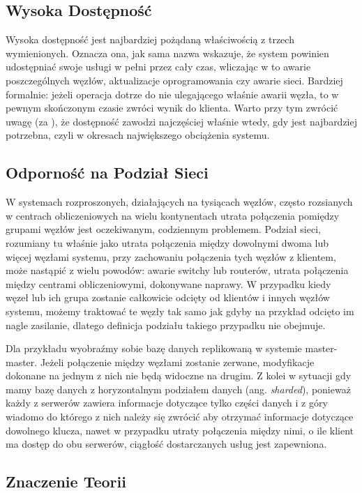 \subsection*{Wysoka Dostępność}

Wysoka dostępność jest najbardziej pożądaną właściwością z trzech wymienionych.
Oznacza ona, jak sama nazwa wskazuje, że system powinien udostępniać swoje usługi w pełni przez cały czas, wliczając w to awarie poszczególnych węzłów, aktualizacje oprogramowania czy awarie sieci. 
Bardziej formalnie: jeżeli operacja dotrze do nie ulegającego właśnie awarii węzła, to w pewnym skończonym czasie zwróci wynik do klienta.
Warto przy tym zwrócić uwagę (za \cite{brewers-conjecture}), że dostępność zawodzi najczęściej właśnie wtedy, gdy jest najbardziej potrzebna, czyli w okresach największego obciążenia systemu.

\subsection*{Odporność na Podział Sieci}

W systemach rozproszonych, działających na tysiącach węzłów, często rozsianych w centrach obliczeniowych na wielu kontynentach utrata połączenia pomiędzy grupami węzłów jest oczekiwanym, codziennym problemem.
Podział sieci, rozumiany tu właśnie jako utrata połączenia między dowolnymi dwoma lub więcej węzłami systemu, przy zachowaniu połączenia tych węzłów z klientem, może nastąpić z wielu powodów: awarie switchy lub routerów, utrata połączenia między centrami obliczeniowymi, dokonywane naprawy.
W przypadku kiedy węzeł lub ich grupa zostanie całkowicie odcięty od klientów i innych węzłów systemu, możemy traktować te węzły tak samo jak gdyby na przykład odcięto im nagle zasilanie, dlatego definicja podziału takiego przypadku nie obejmuje.

Dla przykładu wyobraźmy sobie bazę danych replikowaną w systemie master-master.
Jeżeli połączenie między węzłami zostanie zerwane, modyfikacje dokonane na jednym z nich nie będą widoczne na drugim. 
Z kolei w sytuacji gdy mamy bazę danych z horyzontalnym podziałem danych (ang. \emph{sharded}), ponieważ każdy z serwerów zawiera informacje dotyczące tylko części danych i z góry wiadomo do którego z nich należy się zwrócić aby otrzymać informacje dotyczące dowolnego klucza, nawet w przypadku utraty połączenia między nimi, o ile klient ma dostęp do obu serwerów, ciągłość dostarczanych usług jest zapewniona.

\subsection*{Znaczenie Teorii}

